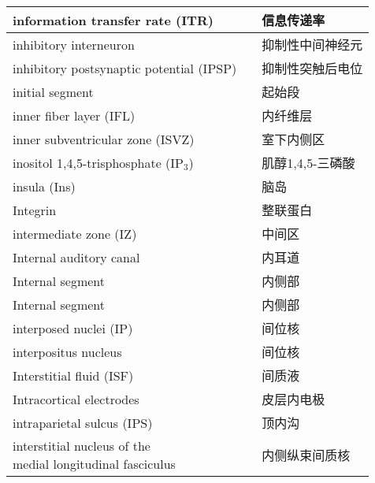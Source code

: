\begin{longtable}{lll}
	\midrule
	information transfer rate (ITR)   && 信息传递率  \\
	
	\midrule
	inhibitory interneuron  && 抑制性中间神经元  \\
	
	\midrule
	inhibitory postsynaptic potential (IPSP)  && 抑制性突触后电位  \\
	
	\midrule
	initial segment && 起始段  \\
	
	\midrule
	inner fiber layer (IFL)   && 内纤维层  \\
	
	\midrule
	inner subventricular zone (ISVZ)   && 室下内侧区  \\
	
	\midrule
	inositol 1,4,5-trisphosphate  (IP$_3$) && 肌醇1,4,5-三磷酸  \\
	
	\midrule
	insula (Ins)   && 脑岛  \\
	
	\midrule
	Integrin  && 整联蛋白  \\
	
	\midrule
	intermediate zone (IZ)  && 中间区  \\
	
	\midrule
	Internal auditory canal   && 内耳道  \\
	
	\midrule
	Internal segment  && 内侧部  \\
	
	\midrule
	Internal segment  && 内侧部  \\
	
	\midrule
	interposed nuclei (IP)  && 间位核  \\
	
	\midrule
	interpositus nucleus  && 间位核  \\
	
	\midrule
	Interstitial fluid (ISF)  && 间质液  \\
	
	\midrule
	Intracortical electrodes   && 皮层内电极  \\
	
	\midrule
	intraparietal sulcus (IPS)   && 顶内沟  \\
	
	\midrule
	\makecell[l]{interstitial nucleus of the \\medial longitudinal fasciculus}   && 内侧纵束间质核  \\
	

\end{longtable}
